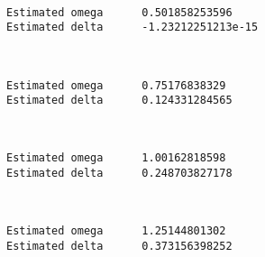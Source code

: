 \documentclass[11pt]{article}
\begin{document}
    \begin{center}
    \end{center}
    { \hspace*{\fill} \\}
    
    \begin{Verbatim}[commandchars=\\\{\}]
Estimated omega 	 0.501858253596
Estimated delta 	 -1.23212251213e-15

    \end{Verbatim}

    \begin{center}
    \end{center}
    { \hspace*{\fill} \\}
    
    \begin{Verbatim}[commandchars=\\\{\}]
Estimated omega 	 0.75176838329
Estimated delta 	 0.124331284565

    \end{Verbatim}

    \begin{center}
    \end{center}
    { \hspace*{\fill} \\}
    
    \begin{Verbatim}[commandchars=\\\{\}]
Estimated omega 	 1.00162818598
Estimated delta 	 0.248703827178

    \end{Verbatim}

    \begin{center}
    \end{center}
    { \hspace*{\fill} \\}
    
    \begin{Verbatim}[commandchars=\\\{\}]
Estimated omega 	 1.25144801302
Estimated delta 	 0.373156398252

    \end{Verbatim}
\end{document}
